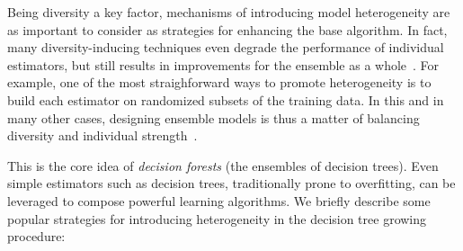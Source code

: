 Being diversity a key factor,
mechanisms of introducing model heterogeneity are as important to consider as strategies for enhancing the base algorithm.
%
In fact, many diversity-inducing techniques even degrade the performance of individual estimators, but still results in improvements for the ensemble as a whole~\cite{breiman2001random,geurts2006extremely}.
For example, one of the most straighforward ways to promote heterogeneity is to build each estimator on randomized subsets of the training data.
In this and in many other cases, designing ensemble models is thus a matter of balancing diversity and individual strength~\cite{breiman2001random}.


%

This is the core idea of \emph{decision forests} (the ensembles of decision trees). Even simple estimators such as decision trees, traditionally prone to overfitting, can be leveraged to compose powerful learning algorithms.
%
We briefly describe some popular strategies for introducing heterogeneity in the decision tree growing procedure:

